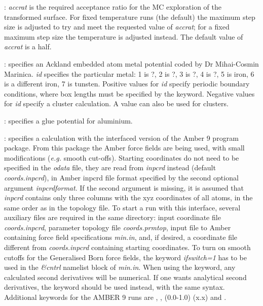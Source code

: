 : {\it accrat\/} is the required acceptance ratio for the MC
exploration of the transformed surface. For fixed temperature runs (the default) the maximum step size
is adjusted to try and meet the requested value of {\it accrat\/}; for a fixed maximum
step size the temperature is adjusted instead. The default value of {\it accrat\/} is a half.

: specifies an Ackland embedded atom metal potential%
coded by Dr Mihai-Cosmin Marinica.
{\it id} specifies the particular metal: 1 is ?, 2 is ?, 3 is ?, 4 is ?, 5 is iron, 6 is a different iron,
7 is tunsten.
Positive values for {\it id} specify periodic boundary conditions, where box lengths must be
specified by the {\/} keyword. 
Negative values for {\it id\/} specify a cluster calculation. A {\/} value can also
be used for clusters.

: specifies a glue potential for aluminium.

: specifies a calculation with the interfaced
version of the Amber 9 program package. From this package the Amber force fields
are being used, with small modifications ({\it e.g.} smooth cut-offs).
Starting coordinates do not need to be specified in the {\it odata} file, they
are read from {\it inpcrd} instead (default {\it coords.inpcrd}), in Amber inpcrd
file format specified by the second optional argument {\it inpcrdformat}.
If the second argument is missing, it is assumed that {\it inpcrd} contains
only three columns with the xyz coordinates of all atoms, in the same order
as in the topology file. To start a run with this interface,
several auxiliary files are required in the same directory: input coordinate file
{\it coords.inpcrd}, parameter topology file {\it coords.prmtop},
input file to Amber containing force field specifications {\it min.in}, and, if
desired, a coordinate file different from {\it coords.inpcrd} containing
starting coordinates.
To turn on smooth cutoffs for the Generalised Born force fields, the keyword
{\it ifswitch=1} has to be used in the {\it \&cntrl} namelist block of {\it min.in}.
When using the {} keyword, any calculated second derivatives will be
numerical. If one wants analytical second derivatives, the {} keyword
should be used instead, with the same syntax. 
Additional keywords for the AMBER 9 runs are {}, {},
{ (0.0-1.0) (x.x)} and {}.

